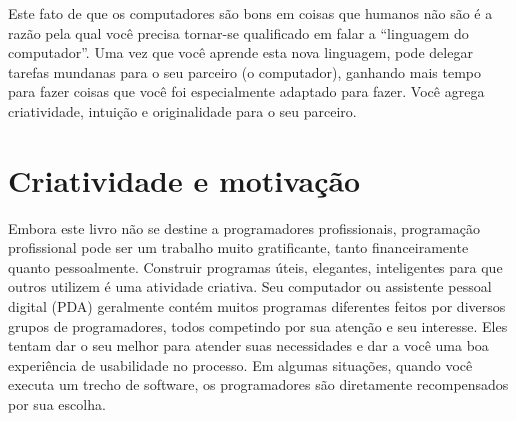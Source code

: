 Este fato de que os computadores são bons em coisas
que humanos não são é a razão pela qual você precisa tornar-se
qualificado em falar a ``linguagem do computador''. Uma vez
que você aprende esta nova linguagem, pode delegar tarefas
mundanas para o seu parceiro (o computador), ganhando mais tempo
para fazer coisas que você foi especialmente adaptado para fazer. Você agrega
criatividade, intuição e originalidade para o seu parceiro. 

\section{Criatividade e motivação}


Embora este livro não se destine a programadores profissionais, programação
profissional pode ser um trabalho muito gratificante, tanto financeiramente
quanto pessoalmente. Construir programas úteis, elegantes, inteligentes para
que outros utilizem é uma atividade criativa. Seu computador ou assistente
pessoal digital (PDA) geralmente contém muitos programas diferentes feitos por
diversos grupos de programadores, todos competindo por sua atenção e seu 
interesse. Eles tentam dar o seu melhor para atender suas necessidades e dar a
você uma boa experiência de usabilidade no processo. Em algumas situações,
quando você executa um trecho de software, os programadores são diretamente
recompensados por sua escolha.

